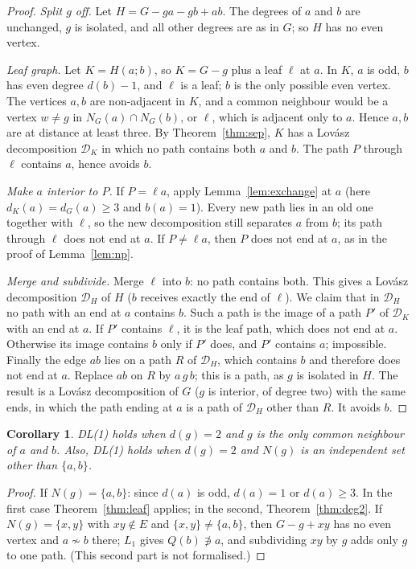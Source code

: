 \documentclass[11pt]{amsart}
\newtheorem{corollary}[theorem]{Corollary}
\theoremstyle{definition}
\newcommand{\cD}{\mathcal D}
\newcommand{\lean}[1]{\quad{\footnotesize[Lean: \texttt{#1}]}}
\begin{document}
\begin{proof}
\emph{Split $g$ off.} Let $H=G-ga-gb+ab$. The degrees of $a$ and $b$ are unchanged, $g$ is isolated,
and all other degrees are as in $G$; so $H$ has no even vertex.

\emph{Leaf graph.} Let $K=H(a;b)$, so $K=G-g$ plus a leaf $\ell$ at $a$. In $K$, $a$ is odd, $b$ has
even degree $d(b)-1$, and $\ell$ is a leaf; $b$ is the only possible even vertex. The vertices $a,b$
are non-adjacent in $K$, and a common neighbour would be a vertex $w\ne g$ in $N_G(a)\cap N_G(b)$, or
$\ell$, which is adjacent only to $a$. Hence $a,b$ are at distance at least three. By
Theorem~\ref{thm:sep}, $K$ has a Lov\'asz decomposition $\cD_K$ in which no path contains both $a$ and
$b$. The path $P$ through $\ell$ contains $a$, hence avoids $b$.

\emph{Make $a$ interior to $P$.} If $P=\ell a$, apply Lemma~\ref{lem:exchange} at $a$ (here
$d_K(a)=d_G(a)\ge3$ and $b(a)=1$). Every new path lies in an old one together with $\ell$, so the new
decomposition still separates $a$ from $b$; its path through $\ell$ does not end at $a$. If
$P\ne\ell a$, then $P$ does not end at $a$, as in the proof of Lemma~\ref{lem:np}.

\emph{Merge and subdivide.} Merge $\ell$ into $b$: no path contains both. This gives a Lov\'asz
decomposition $\cD_H$ of $H$ ($b$ receives exactly the end of $\ell$). We claim that in $\cD_H$ no path
with an end at $a$ contains $b$. Such a path is the image of a path $P'$ of $\cD_K$ with an end at $a$.
If $P'$ contains $\ell$, it is the leaf path, which does not end at $a$. Otherwise its image contains
$b$ only if $P'$ does, and $P'$ contains $a$; impossible. Finally the edge $ab$ lies on a path $R$ of
$\cD_H$, which contains $b$ and therefore does not end at $a$. Replace $ab$ on $R$ by $a\,g\,b$; this
is a path, as $g$ is isolated in $H$. The result is a Lov\'asz decomposition of $G$ ($g$ is interior,
of degree two) with the same ends, in which the path ending at $a$ is a path of $\cD_H$ other than
$R$. It avoids $b$.
\end{proof}

\begin{corollary}\label{cor:deg2}
DL(1) holds when $d(g)=2$ and $g$ is the only common neighbour of $a$ and $b$.
\lean{disjL1\_deg\_two}
Also, DL(1) holds when $d(g)=2$ and $N(g)$ is an independent set other than $\{a,b\}$.
\end{corollary}

\begin{proof}
If $N(g)=\{a,b\}$: since $d(a)$ is odd, $d(a)=1$ or $d(a)\ge3$. In the first case
Theorem~\ref{thm:leaf} applies; in the second, Theorem~\ref{thm:deg2}. If $N(g)=\{x,y\}$ with
$xy\notin E$ and $\{x,y\}\ne\{a,b\}$, then $G-g+xy$ has no even vertex and $a\not\sim b$ there; $L_1$
gives $Q(b)\not\ni a$, and subdividing $xy$ by $g$ adds only $g$ to one path. (This second part is
not formalised.)
\end{proof}
\end{document}
